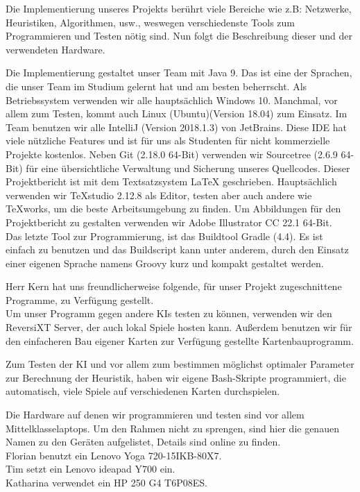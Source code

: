 \documentclass[12pt,a4paper,bibliography=totocnumbered,listof=totocnumbered]{scrartcl}
\begin{document}
	Die Implementierung unseres Projekts berührt viele Bereiche wie z.B: Netzwerke, Heuristiken, Algorithmen, usw., weswegen verschiedenste Tools zum Programmieren und Testen nötig sind. Nun folgt die Beschreibung dieser und der verwendeten Hardware.
	
    Die Implementierung gestaltet unser Team mit Java 9. Das ist eine der Sprachen, die unser Team im Studium gelernt hat und am besten beherrscht. Als Betriebssystem verwenden wir alle hauptsächlich Windows 10. Manchmal, vor allem zum Testen, kommt auch Linux (Ubuntu)(Version 18.04) zum Einsatz. Im Team benutzen wir alle IntelliJ (Version 2018.1.3) von JetBrains. Diese IDE hat viele nützliche Features und ist für uns als Studenten für nicht kommerzielle Projekte kostenlos. Neben Git (2.18.0 64-Bit) verwenden wir Sourcetree (2.6.9 64-Bit) für eine übersichtliche Verwaltung und Sicherung unseres Quellcodes. Dieser Projektbericht ist mit dem Textsatzsystem LaTeX geschrieben. Hauptsächlich verwenden wir TeXstudio 2.12.8 als Editor, testen aber auch andere wie TeXworks, um die beste Arbeitsumgebung zu finden. Um Abbildungen für den Projektbericht zu gestalten verwenden wir Adobe Illustrator CC 22.1 64-Bit.\\
    Das letzte Tool zur Programmierung, ist das Buildtool Gradle (4.4). Es ist einfach zu benutzen und das Buildscript kann unter anderem, durch den Einsatz einer eigenen Sprache namens Groovy kurz und kompakt gestaltet werden. 

	Herr Kern hat uns freundlicherweise folgende, für unser Projekt zugeschnittene Programme, zu Verfügung gestellt.\\
    Um unser Programm gegen andere KIs testen zu können, verwenden wir den ReversiXT Server, der auch lokal Spiele hosten kann. Außerdem benutzen wir für den einfacheren Bau eigener Karten zur Verfügung gestellte Kartenbauprogramm.
    
    Zum Testen der KI und vor allem zum bestimmen möglichst optimaler Parameter zur Berechnung der Heuristik, haben wir eigene Bash-Skripte programmiert, die automatisch, viele Spiele auf verschiedenen Karten durchspielen. 

    Die Hardware auf denen wir programmieren und testen sind vor allem \glqq Mittelklasselaptops\grqq. Um den Rahmen nicht zu sprengen, sind hier die genauen Namen zu den Geräten aufgelistet, Details sind online zu finden.\\
    Florian benutzt ein Lenovo Yoga 720-15IKB-80X7.\footnotemark\\
    Tim setzt ein Lenovo ideapad Y700 ein.\footnotemark\\
    Katharina verwendet ein HP 250 G4 T6P08ES.\footnotemark\\
\end{document}
